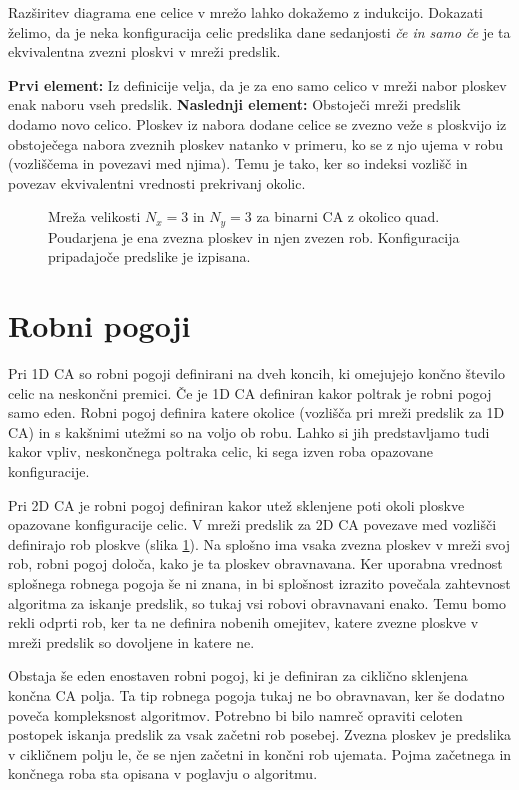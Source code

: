 \documentclass[12pt,a4paper,openany,twoside]{book}
\begin{document}
Razširitev diagrama ene celice v mrežo lahko dokažemo z indukcijo.
Dokazati želimo, da je neka konfiguracija celic predslika dane sedanjosti
\textit{če in samo če} je ta ekvivalentna zvezni ploskvi v mreži predslik.

\textbf{Prvi element:}
Iz definicije velja, da je za eno samo celico v mreži nabor ploskev enak naboru vseh predslik.
\textbf{Naslednji element:}
Obstoječi mreži predslik dodamo novo celico.
Ploskev iz nabora dodane celice se zvezno veže s ploskvijo
iz obstoječega nabora zveznih ploskev natanko v primeru,
ko se z njo ujema v robu (vozliščema in povezavi med njima).
Temu je tako, ker so indeksi vozlišč in povezav ekvivalentni vrednosti prekrivanj okolic.

\begin{figure}[htb]
\centerline{}
\caption[Mreža polja celic.]{Mreža velikosti \(N_x=3\) in \(N_y=3\) za binarni CA z okolico quad.
Poudarjena je ena zvezna ploskev in njen zvezen rob. Konfiguracija pripadajoče predslike je izpisana.}
\label{network_array}
\end{figure}

\section{Robni pogoji} 

Pri 1D CA so robni pogoji definirani na dveh koncih,
ki omejujejo končno število celic na neskončni premici.
Če je 1D CA definiran kakor poltrak je robni pogoj samo eden.
Robni pogoj definira katere okolice (vozlišča pri mreži predslik za 1D CA)
in s kakšnimi utežmi so na voljo ob robu.
Lahko si jih predstavljamo tudi kakor vpliv, neskončnega poltraka celic,
ki sega izven roba opazovane konfiguracije.

Pri 2D CA je robni pogoj definiran kakor utež sklenjene poti okoli ploskve opazovane konfiguracije celic.
V mreži predslik za 2D CA povezave med vozlišči definirajo rob ploskve (slika \ref{network_array}).
Na splošno ima vsaka zvezna ploskev v mreži svoj rob, robni pogoj določa, kako je ta ploskev obravnavana.
Ker uporabna vrednost splošnega robnega pogoja še ni znana,
in bi splošnost izrazito povečala zahtevnost algoritma za iskanje predslik,
so tukaj vsi robovi obravnavani enako. Temu bomo rekli odprti rob,
ker ta ne definira nobenih omejitev, katere zvezne ploskve v mreži predslik
so dovoljene in katere ne.

Obstaja še eden enostaven robni pogoj, ki je definiran za ciklično sklenjena končna CA polja.
Ta tip robnega pogoja tukaj ne bo obravnavan, ker še dodatno poveča kompleksnost algoritmov.
Potrebno bi bilo namreč opraviti celoten postopek iskanja predslik za vsak začetni rob posebej.
Zvezna ploskev je predslika v cikličnem polju le, če se njen začetni in končni rob ujemata.
Pojma začetnega in končnega roba sta opisana v poglavju o algoritmu.
\end{document}
